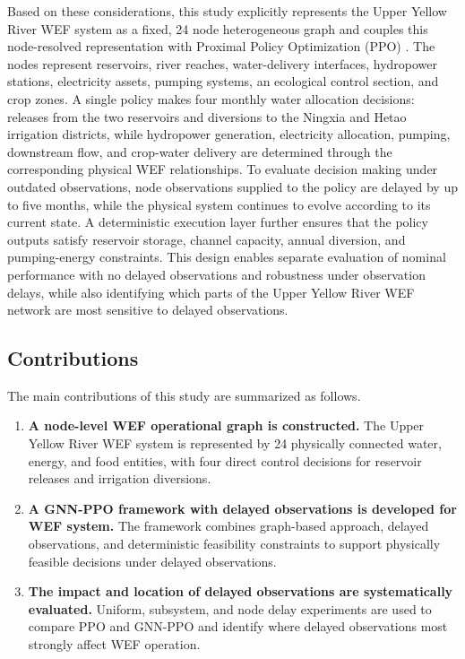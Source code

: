 \documentclass [a4paper,fleqn] {cas-dc}
\begin{document}
Based on these considerations, this study explicitly represents the Upper Yellow River WEF system as a fixed, 24 node heterogeneous graph and couples this node-resolved representation with Proximal Policy Optimization (PPO) \citep{yu2022}. The nodes represent reservoirs, river reaches, water-delivery interfaces, hydropower stations, electricity assets, pumping systems, an ecological control section, and crop zones. A single policy makes four monthly water allocation decisions: releases from the two reservoirs and diversions to the Ningxia and Hetao irrigation districts, while hydropower generation, electricity allocation, pumping, downstream flow, and crop-water delivery are determined through the corresponding physical WEF relationships. To evaluate decision making under outdated observations, node observations supplied to the policy are delayed by up to five months, while the physical system continues to evolve according to its current state. A deterministic execution layer further ensures that the policy outputs satisfy reservoir storage, channel capacity, annual diversion, and pumping-energy constraints. This design enables separate evaluation of nominal performance with no delayed observations and robustness under observation delays, while also identifying which parts of the Upper Yellow River WEF network are most sensitive to delayed observations.



\subsection{Contributions}
\label{sec12}

The main contributions of this study are summarized as follows.

\begin{enumerate}

    \item \textbf{A node-level WEF operational graph is constructed.}
    The Upper Yellow River WEF system is represented by 24 physically connected water, energy, and food entities, with four direct control decisions for reservoir releases and irrigation diversions.

    \item \textbf{A GNN-PPO framework with delayed observations is developed for WEF system.}
    The framework combines graph-based approach, delayed observations, and deterministic feasibility constraints to support physically feasible decisions under delayed observations.

    \item \textbf{The impact and location of delayed observations are systematically evaluated.}
    Uniform, subsystem, and node delay experiments are used to compare PPO and GNN-PPO and identify where delayed observations most strongly affect WEF operation.

\end{enumerate}
\end{document}
